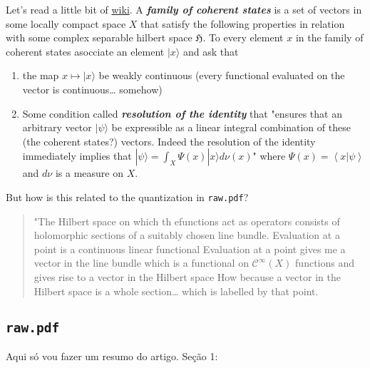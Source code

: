 Let's read a little bit of \href{https://en.wikipedia.org/wiki/Coherent_states_in_mathematical_physics}{wiki}. A \textit{\textbf{family of coherent states}} is a set of vectors in some locally compact space  $X$ that satisfy the following properties in relation with some complex separable hilbert space $\mathfrak{H}$. To every element $x$ in the family of coherent states asocciate an element $|x\rangle$ and ask that
\begin{enumerate}
	\item the map $x\mapsto |x\rangle$ be weakly continuous (every functional evaluated on the vector is continuous… somehow)

	\item Some condition called \textit{\textbf{resolution of the identity}} that "ensures that an arbitrary vector  $|\psi\rangle$ be expressible as a linear integral combination of these (the coherent states?) vectors. Indeed the resolution of the identity immediately implies that $|\psi\rangle=\int_{X}\Psi(x)|x\rangle d\nu(x)$" where $\Psi(x)=\left<x|\psi\right> $ and $d\nu$ is a measure on $X$.
\end{enumerate}

{\color{4}But how is this related to the quantization in \texttt{raw.pdf}}?

{\color{1}\begin{quotation}
		"The Hilbert space on which th efunctions act as operators consists of holomorphic sections of a suitably chosen line bundle. Evaluation at a point is a continuous linear functional {\color{3}Evaluation at a point gives me a vector in the line bundle which is a functional on $\mathcal{C}^\infty(X)$ functions} and gives rise to a vector in the Hilbert space {\color{3}How because a vector in the Hilbert space is a whole section…} which is labelled by that point.
\end{quotation}}

\subsection{\texttt{raw.pdf}}

Aqui só vou fazer um resumo do artigo. Seção 1:

